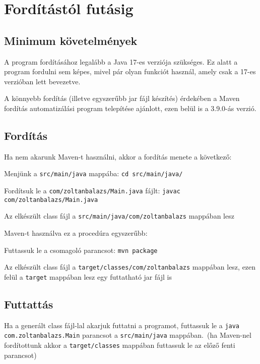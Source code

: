 \section{Fordítástól futásig}

\subsection{Minimum követelmények}

A program fordításához legalább a Java 17-es verziója szükséges. Ez alatt a program fordulni sem képes, mivel pár olyan funkciót használ, amely csak a 17-es verzióban lett bevezetve.

A könnyebb fordítás (illetve egyszerűbb jar fájl készítés) érdekében a Maven fordítás automatizálási program telepítése ajánlott, ezen belül is a 3.9.0-ás verzió.

\subsection{Fordítás}

Ha nem akarunk Maven-t használni, akkor a fordítás menete a következő:
\begin{compactitem}
	\item Menjünk a \lstinline{src/main/java} mappába: \lstinline{cd src/main/java/}
	\item Fordítsuk le a \lstinline{com/zoltanbalazs/Main.java} fájlt: \lstinline{javac com/zoltanbalazs/Main.java}
	\item Az elkészült class fájl a \lstinline{src/main/java/com/zoltanbalazs} mappában lesz 
\end{compactitem}

Maven-t használva ez a procedúra egyszerűbb:
\begin{compactitem}
	\item Futtassuk le a csomagoló parancsot: \lstinline{mvn package}
	\item Az elkészült class fájl a \lstinline{target/classes/com/zoltanbalazs} mappában lesz, ezen felül a \lstinline{target} mappában lesz egy futtatható jar fájl is
\end{compactitem}

\subsection{Futtattás}

Ha a generált class fájl-lal akarjuk futtatni a programot, futtassuk le a \lstinline{java com.zoltanbalazs.Main} parancsot a \lstinline{src/main/java} mappában.\ (ha Maven-nel fordítottunk akkor a \lstinline{target/classes} mappában futtassuk le az előző fenti parancsot)


